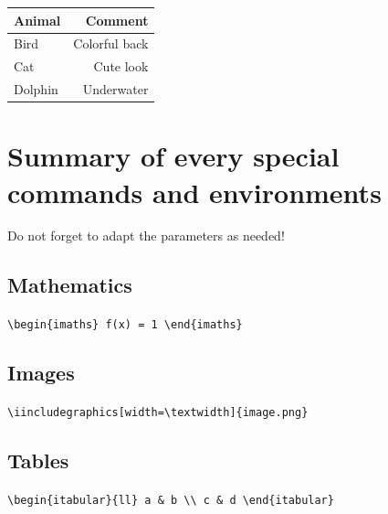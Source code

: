 \documentclass[11pt, a4paper]{article}
\begin{document}
\begin{example}
\begin{gridlayout}{\textwidth}{11cm}
\begin{row}{0.3}
\begin{cell}{0.3}
\begin{tabular}{lr}
                    \toprule
                    Animal & Comment \\
                    \midrule
                    Bird & Colorful back \\
                    Cat & Cute look \\
                    Dolphin & Underwater \\
                    \bottomrule
                \end{tabular}
            \end{cell}
        \end{row}
    \end{gridlayout}
\end{example}





\section{Summary of every special commands and environments}
Do not forget to adapt the parameters as needed!

\subsection*{Mathematics}

\hfill
\lstinline[style=custom-latex]|\begin{imaths} f(x) = 1 \end{imaths}|



\subsection*{Images}

\hfill
\lstinline[style=custom-latex]|\iincludegraphics[width=\textwidth]{image.png}|



\subsection*{Tables}

\hfill
\lstinline[style=custom-latex]|\begin{itabular}{ll} a & b \\ c & d \end{itabular}|
\end{document}
